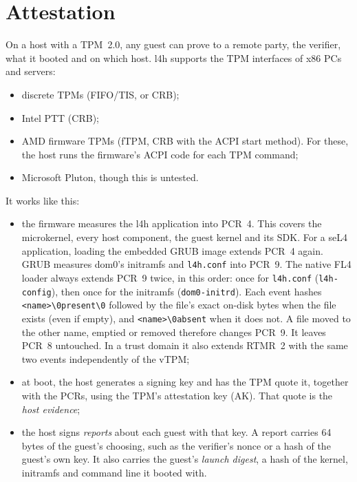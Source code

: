 \documentclass[11pt,a4paper]{report}
\newcommand{\file}[1]{\texttt{#1}}
\begin{document}
\section{Attestation}
\label{sec:attest}

On a host with a TPM~2.0, any guest can prove to a remote party, the
verifier, what it booted and on which host. l4h supports the TPM
interfaces of x86 PCs and servers:
\begin{itemize}
  \item discrete TPMs (FIFO/TIS, or CRB);
  \item Intel PTT (CRB);
  \item AMD firmware TPMs (fTPM, CRB with the ACPI start method). For these,
        the host runs the firmware's ACPI code for each TPM command;
  \item Microsoft Pluton, though this is untested.
\end{itemize}
It works like this:
\begin{itemize}
  \item the firmware measures the l4h application into PCR~4. This covers
        the microkernel, every host component, the guest kernel and its SDK.
        For a seL4 application, loading the embedded GRUB image extends PCR~4
        again. GRUB measures dom0's initramfs and \file{l4h.conf} into PCR~9.
        The native FL4 loader always extends PCR~9 twice, in this order:
        once for \file{l4h.conf} (\texttt{l4h-config}), then once for the
        initramfs (\texttt{dom0-initrd}). Each event hashes
        \texttt{<name>\textbackslash0present\textbackslash0} followed by the
        file's exact on-disk bytes when the file exists (even if empty), and
        \texttt{<name>\textbackslash0absent} when it does not. A file moved
        to the other name, emptied or removed therefore changes PCR~9.
        It leaves PCR~8 untouched. In a trust domain it also extends RTMR~2
        with the same two events independently of the vTPM;
  \item at boot, the host generates a signing key and has the TPM quote it,
        together with the PCRs, using the TPM's attestation key (AK). That
        quote is the \emph{host evidence};
  \item the host signs \emph{reports} about each guest with that key. A
        report carries 64 bytes of the guest's choosing, such as the
        verifier's nonce or a hash of the guest's own key. It also carries
        the guest's \emph{launch digest}, a hash of the kernel, initramfs
        and command line it booted with.
\end{itemize}
\end{document}
